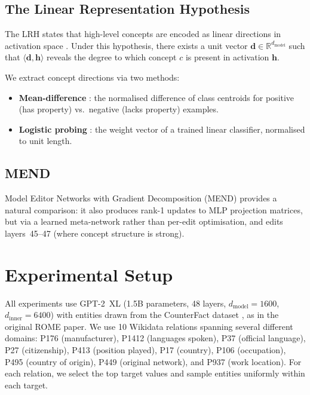 \documentclass[11pt,a4paper]{article}
\newcommand{\hh}{\mathbf{h}}
\newcommand{\dd}{\mathbf{d}}
\newcommand{\R}{\mathbb{R}}
\begin{document}
\subsection{The Linear Representation Hypothesis}

The LRH states that high-level concepts are encoded as linear directions in activation space \citep{lrhorig}.
Under this hypothesis, there exists a unit vector $\dd \in \R^{d_\text{model}}$ such that $\langle \dd, \hh \rangle$ reveals the degree to which concept $c$ is present in activation $\hh$.

We extract concept directions via two methods:
\begin{itemize}[nosep]
\item \textbf{Mean-difference} \citep{burns2022discovering}: the normalised difference of class centroids for positive (has property) vs.\ negative (lacks property) examples.
\item \textbf{Logistic probing} \citep{belinkov2022probing}: the weight vector of a trained linear classifier, normalised to unit length.
\end{itemize}

\subsection{MEND}

Model Editor Networks with Gradient Decomposition (MEND) \citep{mitchell2022fast} provides a natural comparison: it also produces rank-1 updates to MLP projection matrices, but via a learned meta-network rather than per-edit optimisation, and edits layers~45--47 (where concept structure is strong).


\section{Experimental Setup}
\label{sec:setup}

All experiments use GPT-2~XL (1.5B parameters, 48 layers, $d_\text{model} = 1600$, $d_\text{inner} = 6400$) with entities drawn from the CounterFact dataset \citep{meng2022locating}, as in the original ROME paper.
We use 10 Wikidata relations spanning several different domains: P176 (manufacturer), P1412 (languages spoken), P37 (official language), P27 (citizenship), P413 (position played), P17 (country), P106 (occupation), P495 (country of origin), P449 (original network), and P937 (work location).
For each relation, we select the top target values and sample entities uniformly within each target.
\end{document}
